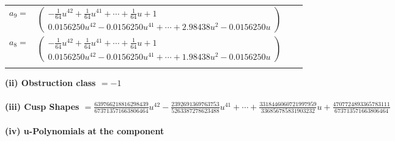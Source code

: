 \documentclass[1p]{elsarticle_modified}
\theoremstyle{definition}
\begin{document}
\begin{tabular}{m{7pt} m{180pt} m{7pt} m{180pt} }
\flushright $a_{9}=$&$\begin{pmatrix}-\frac{1}{64} u^{42}+\frac{1}{64} u^{41}+\cdots+\frac{1}{64} u+1\\0.0156250 u^{42}-0.0156250 u^{41}+\cdots+2.98438 u^{2}-0.0156250 u\end{pmatrix}$ \\
\flushright $a_{8}=$&$\begin{pmatrix}-\frac{1}{64} u^{42}+\frac{1}{64} u^{41}+\cdots+\frac{1}{64} u+1\\0.0156250 u^{42}-0.0156250 u^{41}+\cdots+1.98438 u^{2}-0.0156250 u\end{pmatrix}$\\&\end{tabular}
\flushleft \textbf{(ii) Obstruction class $= -1$}\\~\\
\flushleft \textbf{(iii) Cusp Shapes $= \frac{639766218816298439}{673713571663806464} u^{42}-\frac{2392691369763753}{5263387278623488} u^{41}+\cdots+\frac{3318446060721997959}{336856785831903232} u+\frac{4707724893365783111}{673713571663806464}$}\\~\\
\newpage\renewcommand{\arraystretch}{1}
\flushleft \textbf{(iv) u-Polynomials at the component}\newline \\
\end{document}

